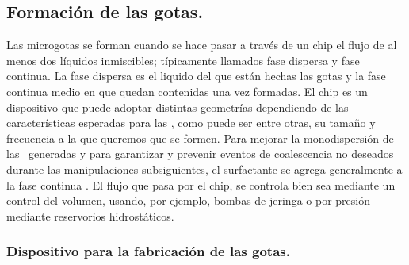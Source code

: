 
\subsection{Formación de las gotas.}\label{sec:antecedentes:formacion_gotas}
Las microgotas se forman cuando se hace pasar a través de un chip el flujo de al menos dos líquidos inmiscibles; típicamente llamados fase dispersa y fase continua. 
La fase dispersa es el liquido del que están hechas las gotas y la fase continua medio en que quedan contenidas una vez formadas. El chip es un dispositivo que puede adoptar distintas geometrías dependiendo de las características esperadas para las \gotas, como puede ser entre otras, su tamaño y frecuencia a la que queremos que se formen. Para mejorar la monodispersión de las \gotas\ generadas y para garantizar y prevenir eventos de coalescencia no deseados durante las manipulaciones subsiguientes, el surfactante se agrega generalmente a la fase continua \citep{article:ralf}.
El flujo que pasa por el chip, se controla bien sea mediante un control del volumen, usando, por ejemplo, bombas de jeringa o por presión mediante reservorios hidrostáticos.


\subsubsection{Dispositivo para la fabricación de las gotas. }\label{sec:antecedentes:chip}





